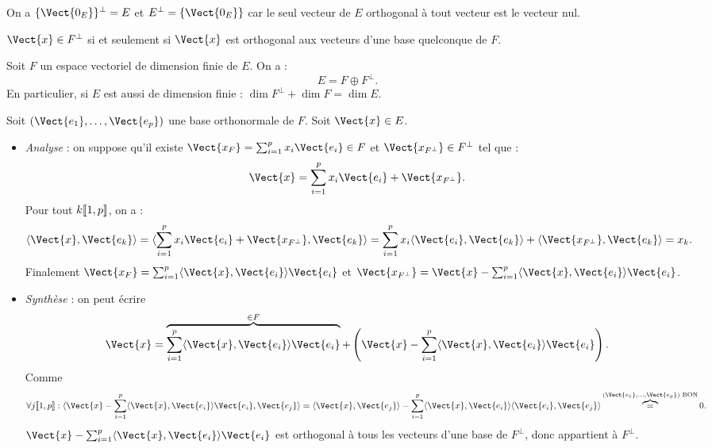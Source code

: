 \documentclass{book}
\begin{document}
\begin{Exemple}
On a $\{\Vect{0_E}\}^{\perp}=E$ et $E^{\perp}=\{\Vect{0_E}\}$ car le seul vecteur de $E$ orthogonal à tout vecteur est le vecteur nul. 
\end{Exemple}
\begin{Proposition}
$\Vect{x}\in F^{\perp}$ si et seulement si $\Vect{x}$ est orthogonal aux vecteurs d'une base quelconque de $F$. 
\end{Proposition}

\begin{Proposition}
Soit $F$ un espace vectoriel de dimension finie de $E$. On a :
$$E=F\oplus F^{\perp}.$$
En particulier, si $E$ est aussi de dimension finie : $\dim F^{\perp}+\dim F=\dim E$.\\
\begin{center}
\end{center}
\end{Proposition}
\begin{Demonstration}
Soit $(\Vect{e_1},\dots,\Vect{e_p})$ une base orthonormale de $F$. Soit $\Vect{x}\in E$.
\begin{itemize}
\item  \textit{Analyse} : on suppose qu'il existe $\Vect{x_F}=\sum_{i=1}^p x_i \Vect{e_i}\in F$ et $\Vect{x_{F^{\perp}}}\in F^{\perp}$ tel que :
$$\Vect{x} = \sum_{i=1}^p x_i \Vect{e_i} + \Vect{x_{F^{\perp}}}.$$
Pour tout $k\mathopen\lbrack\!\lbrack1,p \mathclose\rbrack\!\rbrack$, on a :
$$\PS{\Vect{x}}{\Vect{e_k}} = \PS{\sum_{i=1}^p x_i \Vect{e_i} + \Vect{x_{F^{\perp}}}}{\Vect{e_k}}=\sum_{i=1}^p x_i\PS{ \Vect{e_i}}{\Vect{e_k}} + \PS{\Vect{x_{F^{\perp}}}}{\Vect{e_k}}=x_k.$$
Finalement  $\Vect{x_F}=\sum_{i=1}^p \PS{\Vect{x}}{\Vect{e_i}} \Vect{e_i}$ et $\Vect{x_{F^{\perp}}}=\Vect{x}-\sum_{i=1}^p \PS{\Vect{x}}{\Vect{e_i}} \Vect{e_i}$.
\item  \textit{Synthèse} : on peut écrire 
$$\Vect{x} =\overbrace{\sum_{i=1}^p \PS{\Vect{x}}{\Vect{e_i}} \Vect{e_i}}^{\in F}+ \left(\Vect{x}-\sum_{i=1}^p \PS{\Vect{x}}{\Vect{e_i}} \Vect{e_i}\right).$$
Comme
$$\forall  j\Intf{1}{p}:\PS{\Vect{x}-\sum_{i=1}^p \PS{\Vect{x}}{\Vect{e_i}} \Vect{e_i}}{\Vect{e_j}} =\PS{\Vect{x}}{\Vect{e_j}} -\sum_{i=1}^p \PS{\Vect{x}}{\Vect{e_i}}\PS{ \Vect{e_i}}{\Vect{e_j}}\overbrace{=}^{(\Vect{e_1},\dots,\Vect{e_p}) \text{ BON} }0. $$ 
$\Vect{x}-\sum_{i=1}^p \PS{\Vect{x}}{\Vect{e_i}} \Vect{e_i}$ est orthogonal à tous les vecteurs d'une base de $F^{\perp}$, donc appartient à  $F^{\perp}$.
\end{itemize}

\end{Demonstration}
\end{document}
